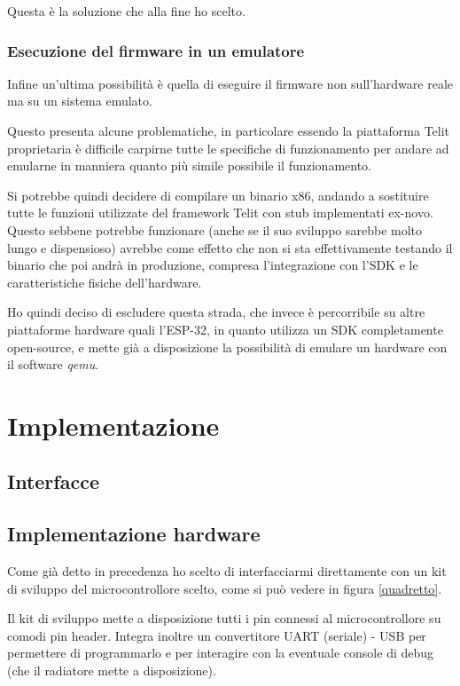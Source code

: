 \documentclass[a4paper,titlepage]{article}
\begin{document}
Questa è la soluzione che alla fine ho scelto.

\subsubsection{Esecuzione del firmware in un emulatore}

Infine un'ultima possibilità è quella di eseguire il firmware non sull'hardware
reale ma su un sistema emulato.

Questo presenta alcune problematiche, in particolare essendo la piattaforma Telit
proprietaria è difficile carpirne tutte le specifiche di funzionamento per andare
ad emularne in manniera quanto più simile possibile il funzionamento.

Si potrebbe quindi decidere di compilare un binario x86, andando a sostituire tutte
le funzioni utilizzate del framework Telit con stub implementati ex-novo. Questo
sebbene potrebbe funzionare (anche se il suo sviluppo sarebbe molto lungo e dispensioso)
avrebbe come effetto che non si sta effettivamente testando il binario che poi andrà
in produzione, compresa l'integrazione con l'SDK e le caratteristiche fisiche dell'hardware.

Ho quindi deciso di escludere questa strada, che invece è percorribile su altre
piattaforme hardware quali l'ESP-32, in quanto utilizza un SDK completamente open-source,
e mette già a disposizione la possibilità di emulare un hardware con il software \textit{qemu}.

\section{Implementazione}

\subsection{Interfacce}

\subsection{Implementazione hardware}

Come già detto in precedenza ho scelto di interfacciarmi direttamente con un kit
di sviluppo del microcontrollore scelto, come si può vedere in figura \ref{quadretto}.

Il kit di sviluppo mette a disposizione tutti i pin connessi al microcontrollore
su comodi pin header. Integra inoltre un convertitore UART (seriale) - USB per
permettere di programmarlo e per interagire con la eventuale console di debug
(che il radiatore mette a disposizione).
\end{document}
